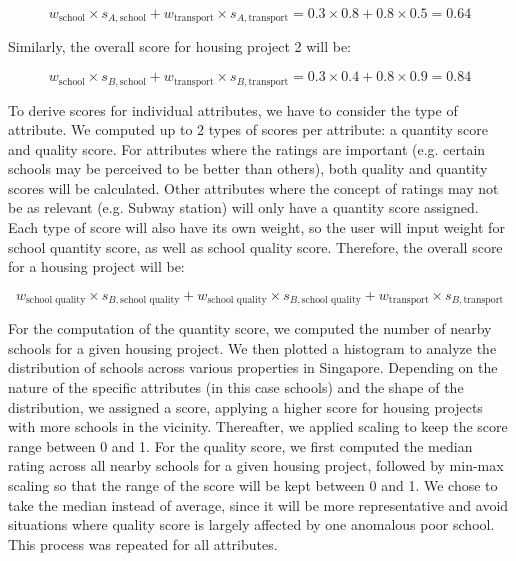 \documentclass[a4paper, 11pt]{article}
\begin{document}
\[ w_{\text{school}} \times s_{A,\text{school}} + w_{\text{transport}} \times s_{A,\text{transport}} = 0.3 \times 0.8 + 0.8 \times 0.5 = 0.64 \]

Similarly, the overall score for housing project 2 will be:

    \[ w_{\text{school}} \times s_{B,\text{school}} + w_{\text{transport}} \times s_{B,\text{transport}} = 0.3 \times 0.4 + 0.8 \times 0.9 = 0.84 \]

To derive scores for individual attributes, we have to consider the type of attribute. We computed up to 2 types of scores per attribute: a quantity score and quality score. For attributes where the ratings are important (e.g. certain schools may be perceived to be better than others), both quality and quantity scores will be calculated. Other attributes where the concept of ratings may not be as relevant (e.g. Subway station) will only have a quantity score assigned. Each type of score will also have its own weight, so the user will input weight for school quantity score, as well as school quality score. Therefore, the overall score for a housing project will be:

\[ w_{\text{school quality}} \times s_{B,\text{school quality}} + w_{\text{school quality}} \times s_{B,\text{school quality}} + w_{\text{transport}} \times s_{B,\text{transport}} \]

For the computation of the quantity score, we computed the number of nearby schools for a given housing project. We then plotted a histogram to analyze the distribution of schools across various properties in Singapore. Depending on the nature of the specific attributes (in this case schools) and the shape of the distribution, we assigned a score, applying a higher score for housing projects with more schools in the vicinity. Thereafter, we applied scaling to keep the score range between 0 and 1. For the quality score, we first computed the median rating across all nearby schools for a given housing project, followed by min-max scaling so that the range of the score will be kept between 0 and 1. We chose to take the median instead of average, since it will be more representative and avoid situations where quality score is largely affected by one anomalous poor school. This process was repeated for all attributes.
\end{document}
